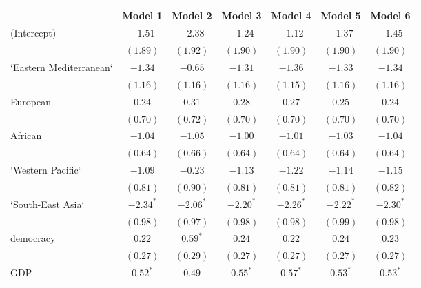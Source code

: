 
\begin{table}[!h]
\begin{center}
\begin{tabular}{l c c c c c c }
\toprule
 & Model 1 & Model 2 & Model 3 & Model 4 & Model 5 & Model 6 \\
\midrule
(Intercept)             & $-1.51$      & $-2.38$      & $-1.24$      & $-1.12$      & $-1.37$      & $-1.45$      \\
                        & $(1.89)$     & $(1.92)$     & $(1.90)$     & $(1.90)$     & $(1.90)$     & $(1.90)$     \\
`Eastern Mediterranean` & $-1.34$      & $-0.65$      & $-1.31$      & $-1.36$      & $-1.33$      & $-1.34$      \\
                        & $(1.16)$     & $(1.16)$     & $(1.16)$     & $(1.15)$     & $(1.16)$     & $(1.16)$     \\
European                & $0.24$       & $0.31$       & $0.28$       & $0.27$       & $0.25$       & $0.24$       \\
                        & $(0.70)$     & $(0.72)$     & $(0.70)$     & $(0.70)$     & $(0.70)$     & $(0.70)$     \\
African                 & $-1.04$      & $-1.05$      & $-1.00$      & $-1.01$      & $-1.03$      & $-1.04$      \\
                        & $(0.64)$     & $(0.66)$     & $(0.64)$     & $(0.64)$     & $(0.64)$     & $(0.64)$     \\
`Western Pacific`       & $-1.09$      & $-0.23$      & $-1.13$      & $-1.22$      & $-1.14$      & $-1.15$      \\
                        & $(0.81)$     & $(0.90)$     & $(0.81)$     & $(0.81)$     & $(0.81)$     & $(0.82)$     \\
`South-East Asia`       & $-2.34^{*}$  & $-2.06^{*}$  & $-2.20^{*}$  & $-2.26^{*}$  & $-2.22^{*}$  & $-2.30^{*}$  \\
                        & $(0.98)$     & $(0.97)$     & $(0.98)$     & $(0.98)$     & $(0.99)$     & $(0.98)$     \\
democracy               & $0.22$       & $0.59^{*}$   & $0.24$       & $0.22$       & $0.24$       & $0.23$       \\
                        & $(0.27)$     & $(0.29)$     & $(0.27)$     & $(0.27)$     & $(0.27)$     & $(0.27)$     \\
GDP                     & $0.52^{*}$   & $0.49$       & $0.55^{*}$   & $0.57^{*}$   & $0.53^{*}$   & $0.53^{*}$   \\

\end{tabular}
\end{center}
\end{table}
